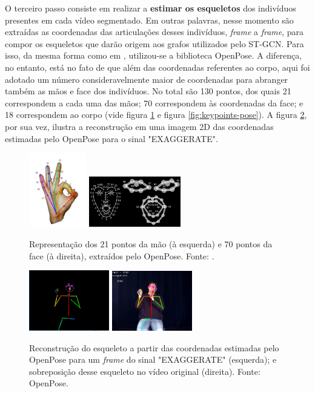 O terceiro passo consiste em realizar a \textbf{estimar os esqueletos} dos indivíduos presentes em cada vídeo segmentado. Em outras palavras, nesse momento são extraídas as coordenadas das articulações desses indivíduos, \textit{frame} a \textit{frame}, para compor os esqueletos que darão origem aos grafos utilizados pelo ST-GCN. Para isso, da mesma forma como em \cite{st-gcn-2018}, utilizou-se a biblioteca OpenPose. A diferença, no entanto, está no fato de que além das coordenadas referentes ao corpo, aqui foi adotado um número consideravelmente maior de coordenadas para abranger também as mãos e face dos indivíduos. No total são 130 pontos, dos quais 21 correspondem a cada uma das mãos; 70 correspondem às coordenadas da face; e 18 correspondem ao corpo (vide figura \ref{fig:keypoints-face-hand} e figura \ref{fig:keypoints-pose}). A figura \ref{fig:sign-pose}, por sua vez, ilustra a reconstrução em uma imagem 2D das coordenadas estimadas pelo OpenPose para o sinal "EXAGGERATE".


\begin{figure}[ht]
    \centering
    \includegraphics[width=2.5cm]{images/keypoints_hand}
    \includegraphics[width=4cm]{images/keypoints_face}
    \caption{Representação dos 21 pontos da mão (à esquerda) e 70 pontos da face (à direita), extraídos pelo OpenPose. Fonte: \cite{openpose-output-2018}.}
    \label{fig:keypoints-face-hand}
\end{figure}

\begin{figure}[ht]
    \centering
    \includegraphics[width=3.5cm]{images/sign_pose}
    \includegraphics[width=3.5cm]{images/sign_pose_blended}
    \caption{Reconstrução do esqueleto a partir das coordenadas estimadas pelo OpenPose para um \textit{frame} do sinal "EXAGGERATE" (esquerda); e sobreposição desse esqueleto no vídeo original (direita). Fonte: OpenPose.}
    \label{fig:sign-pose}
\end{figure}

